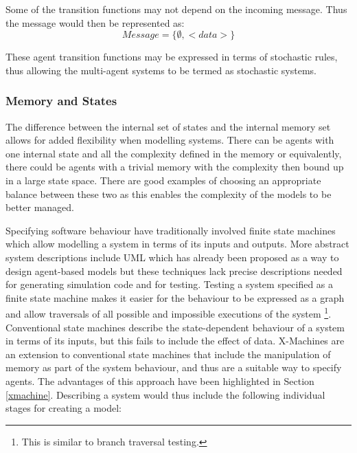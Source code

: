 
Some of the transition functions may not depend on the incoming
message. Thus the message would then be represented as:
\begin{equation}\label{msg}
    Message = \{ \emptyset, <data> \}
\end{equation}

These agent transition functions may be expressed in terms of
stochastic rules, thus allowing the multi-agent systems to be termed
as stochastic systems.

\subsubsection{Memory and States}
The difference between the internal set of states and the internal
memory set allows for added flexibility when modelling systems.
There can be agents with one internal state and all the complexity
defined in the memory or equivalently, there could be agents with
a trivial memory with the complexity then bound up in a large state
space. There are good examples of choosing an appropriate balance
between these two as this enables the complexity of the models to be
better managed.


Specifying software behaviour have traditionally involved finite state
machines which allow modelling a system in terms of its inputs and outputs.
More abstract system descriptions include UML which has already been proposed as a way to design agent-based models \cite{BAUER:2000,BAUER:2001,HUGET:2002,WEISBUCH:2000} but these techniques lack precise descriptions needed for generating simulation code and for testing.
Testing a system specified as a finite state machine makes it easier for the behaviour to be expressed as a graph
and allow traversals of all possible and impossible executions of the system \footnote{This is similar to branch traversal testing.}. Conventional state machines describe the state-dependent behaviour of a system in terms of its inputs, but this fails to include the effect of data.
X-Machines are an extension to conventional state machines that
include the manipulation of memory as part of the system behaviour,
and thus are a suitable way to specify agents. The advantages of this
approach have been highlighted in Section \ref{xmachine}. Describing a system would thus include the following individual
stages for creating a model:

